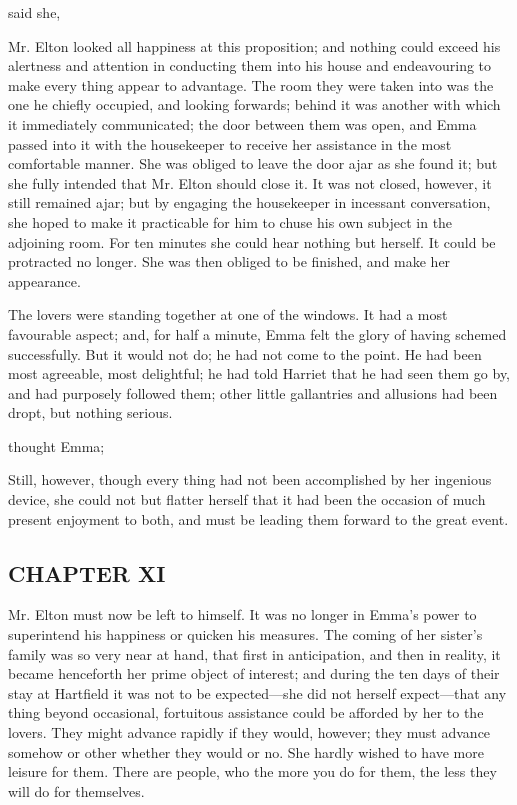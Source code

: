  said she, 

Mr. Elton looked all happiness at this proposition; and nothing could exceed his alertness and attention in conducting them into his house and endeavouring to make every thing appear to advantage. The room they were taken into was the one he chiefly occupied, and looking forwards; behind it was another with which it immediately communicated; the door between them was open, and Emma passed into it with the housekeeper to receive her assistance in the most comfortable manner. She was obliged to leave the door ajar as she found it; but she fully intended that Mr. Elton should close it. It was not closed, however, it still remained ajar; but by engaging the housekeeper in incessant conversation, she hoped to make it practicable for him to chuse his own subject in the adjoining room. For ten minutes she could hear nothing but herself. It could be protracted no longer. She was then obliged to be finished, and make her appearance.

The lovers were standing together at one of the windows. It had a most favourable aspect; and, for half a minute, Emma felt the glory of having schemed successfully. But it would not do; he had not come to the point. He had been most agreeable, most delightful; he had told Harriet that he had seen them go by, and had purposely followed them; other little gallantries and allusions had been dropt, but nothing serious.

 thought Emma; 

Still, however, though every thing had not been accomplished by her ingenious device, she could not but flatter herself that it had been the occasion of much present enjoyment to both, and must be leading them forward to the great event.

\subsection[chapter-xi]{\useURL[url11][][][]\from[url11]CHAPTER XI}

Mr. Elton must now be left to himself. It was no longer in Emma's power to superintend his happiness or quicken his measures. The coming of her sister's family was so very near at hand, that first in anticipation, and then in reality, it became henceforth her prime object of interest; and during the ten days of their stay at Hartfield it was not to be expected---she did not herself expect---that any thing beyond occasional, fortuitous assistance could be afforded by her to the lovers. They might advance rapidly if they would, however; they must advance somehow or other whether they would or no. She hardly wished to have more leisure for them. There are people, who the more you do for them, the less they will do for themselves.

